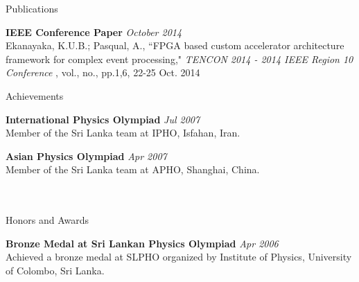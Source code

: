 \documentclass[
11pt, %
]{./../assets/resume} %
\begin{document}
\begin{rSection}{Publications}

	\textbf{IEEE Conference Paper } \hfill  \textit{October 2014}\\
	Ekanayaka, K.U.B.; Pasqual, A., ``FPGA based custom accelerator architecture framework for complex event processing," \emph{TENCON 2014 - 2014 IEEE Region 10 Conference} , vol., no., pp.1,6, 22-25 Oct. 2014

\end{rSection}
 
\begin{rSection}{Achievements}

	\textbf{International Physics Olympiad} \hfill \textit{Jul 2007}\\
	Member of the Sri Lanka team at IPHO, Isfahan, Iran.

	\textbf{Asian Physics Olympiad} \hfill \textit{Apr 2007}\\
	Member of the Sri Lanka team at APHO, Shanghai, China.
	\\
	\\
	\\

\end{rSection}
\begin{rSection}{Honors and Awards}

	\textbf{Bronze Medal at Sri Lankan Physics Olympiad} \hfill \textit{Apr 2006}\\
	Achieved a bronze medal at SLPHO organized by Institute of Physics, University of Colombo, Sri Lanka.


\end{rSection}
\end{document}
